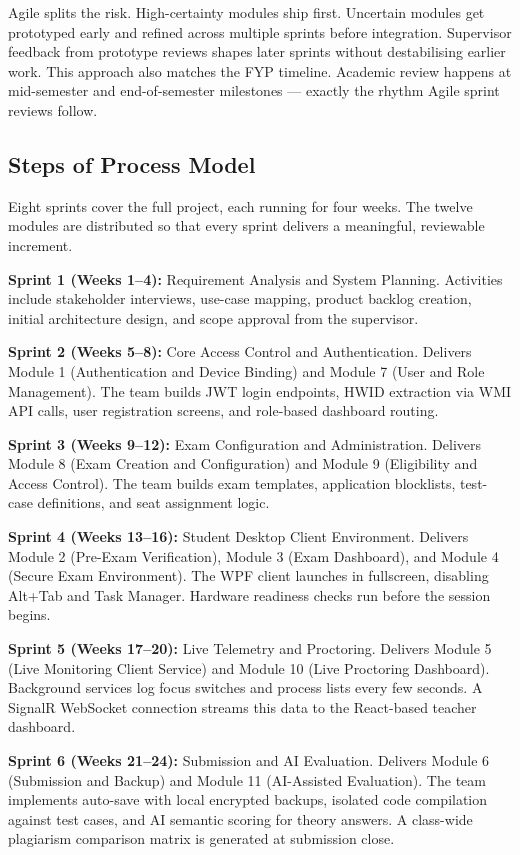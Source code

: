 Agile splits the risk. High-certainty modules ship first. Uncertain modules get prototyped early and refined across multiple sprints before integration. Supervisor feedback from prototype reviews shapes later sprints without destabilising earlier work. This approach also matches the FYP timeline. Academic review happens at mid-semester and end-of-semester milestones — exactly the rhythm Agile sprint reviews follow.

\subsection{Steps of Process Model}

Eight sprints cover the full project, each running for four weeks. The twelve modules are distributed so that every sprint delivers a meaningful, reviewable increment.

\textbf{Sprint 1 (Weeks 1--4):} Requirement Analysis and System Planning. Activities include stakeholder interviews, use-case mapping, product backlog creation, initial architecture design, and scope approval from the supervisor.

\textbf{Sprint 2 (Weeks 5--8):} Core Access Control and Authentication. Delivers Module 1 (Authentication and Device Binding) and Module 7 (User and Role Management). The team builds JWT login endpoints, HWID extraction via WMI API calls, user registration screens, and role-based dashboard routing.

\textbf{Sprint 3 (Weeks 9--12):} Exam Configuration and Administration. Delivers Module 8 (Exam Creation and Configuration) and Module 9 (Eligibility and Access Control). The team builds exam templates, application blocklists, test-case definitions, and seat assignment logic.

\textbf{Sprint 4 (Weeks 13--16):} Student Desktop Client Environment. Delivers Module 2 (Pre-Exam Verification), Module 3 (Exam Dashboard), and Module 4 (Secure Exam Environment). The WPF client launches in fullscreen, disabling Alt+Tab and Task Manager. Hardware readiness checks run before the session begins.

\textbf{Sprint 5 (Weeks 17--20):} Live Telemetry and Proctoring. Delivers Module 5 (Live Monitoring Client Service) and Module 10 (Live Proctoring Dashboard). Background services log focus switches and process lists every few seconds. A SignalR WebSocket connection streams this data to the React-based teacher dashboard.

\textbf{Sprint 6 (Weeks 21--24):} Submission and AI Evaluation. Delivers Module 6 (Submission and Backup) and Module 11 (AI-Assisted Evaluation). The team implements auto-save with local encrypted backups, isolated code compilation against test cases, and AI semantic scoring for theory answers. A class-wide plagiarism comparison matrix is generated at submission close.

